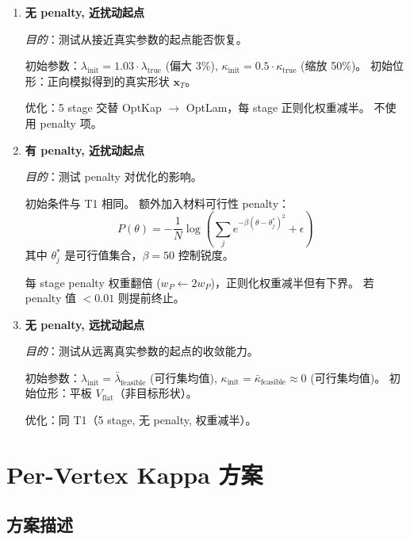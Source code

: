 \documentclass[12pt,a4paper]{article}
\begin{document}
\begin{enumerate}[label=\textbf{T\arabic*:}]
    \item \textbf{无 penalty, 近扰动起点}

    \textit{目的}：测试从接近真实参数的起点能否恢复。

    初始参数：$\lambda_\text{init} = 1.03 \cdot \lambda_\text{true}$ (偏大 3\%),
    $\kappa_\text{init} = 0.5 \cdot \kappa_\text{true}$ (缩放 50\%)。
    初始位形：正向模拟得到的真实形状 $\mathbf{x}_T$。

    优化：5 stage 交替 OptKap $\to$ OptLam，每 stage 正则化权重减半。
    不使用 penalty 项。

    \item \textbf{有 penalty, 近扰动起点}

    \textit{目的}：测试 penalty 对优化的影响。

    初始条件与 T1 相同。
    额外加入材料可行性 penalty：
    \begin{equation}
        P(\theta) = -\frac{1}{N} \log\left(\sum_j e^{-\beta(\theta - \theta_j^*)^2} + \epsilon\right)
    \end{equation}
    其中 $\theta_j^*$ 是可行值集合，$\beta=50$ 控制锐度。

    每 stage penalty 权重翻倍 ($w_P \leftarrow 2 w_P$)，正则化权重减半但有下界。
    若 penalty 值 $< 0.01$ 则提前终止。

    \item \textbf{无 penalty, 远扰动起点}

    \textit{目的}：测试从远离真实参数的起点的收敛能力。

    初始参数：$\lambda_\text{init} = \bar{\lambda}_\text{feasible}$ (可行集均值),
    $\kappa_\text{init} = \bar{\kappa}_\text{feasible} \approx 0$ (可行集均值)。
    初始位形：平板 $V_\text{flat}$（非目标形状）。

    优化：同 T1（5 stage, 无 penalty, 权重减半）。
\end{enumerate}

\section{Per-Vertex Kappa 方案}

\subsection{方案描述}
\end{document}
